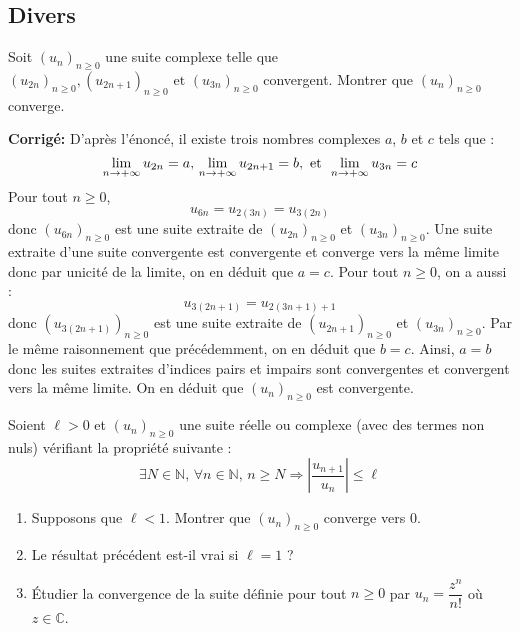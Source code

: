 \documentclass[a4paper,twoside,french,10pt]{VcCours}
\newcommand{\corr}{\textbf{Corrigé:}}
\begin{document}
\newpage

\subsection{Divers}

\medskip

\begin{Exercice}{} Soit $(u_n)_{n \geq 0}$ une suite complexe telle que $(u_{2n})_{n \geq 0},(u_{2n + 1})_{n \geq 0}{\text{ et }}(u_{3n})_{n \geq 0}$ convergent. Montrer que $(u_n)_{n \geq 0}$ converge.
\end{Exercice} 

\corr
D'après l'énoncé, il existe trois nombres complexes $a$, $b$ et $c$ tels que :
$$ \lim_{n \rightarrow + \infty} u_{2n} = a, \,  \lim_{n \rightarrow + \infty} u_{2n+1} = b,  \hbox{ et } \, \lim_{n \rightarrow + \infty} u_{3n} = c$$
Pour tout $n \geq 0$,
$$ u_{6n} = u_{2(3n)}=u_{3(2n)}$$
donc $(u_{6n})_{n \geq 0}$ est une suite extraite de $(u_{2n})_{n \geq 0}$ et $(u_{3n})_{n \geq 0}$. Une suite extraite d'une suite convergente est convergente et converge vers la même limite donc par unicité de la limite, on en déduit que $a=c$. Pour tout $n \geq 0$, on a aussi :
$$ u_{3(2n+1)}=u_{2(3n+1)+1}$$
donc $(u_{3(2n+1)})_{n \geq 0}$ est une suite extraite de $(u_{2n+1})_{n \geq 0}$ et $(u_{3n})_{n \geq 0}$. Par le même raisonnement que précédemment, on en déduit que $b=c$. Ainsi, $a=b$ donc les suites extraites d'indices pairs et impairs sont convergentes et convergent vers la même limite. On en déduit que $(u_n)_{n \geq 0}$ est convergente. 

\medskip


\begin{Exercice}{} Soient $\ell>0$ et $(u_n)_{n \geq 0}$ une suite réelle ou complexe (avec des termes non nuls) vérifiant la propriété suivante :
$$\exists N \in \mathbb{N}, \, \forall n \in \mathbb{N}, \, n \geq N \Longrightarrow \left\vert \frac{u_{n+1}}{u_n} \right\vert   \leq \ell$$

\begin{enumerate}
\item Supposons que $\ell<1$. Montrer que $(u_n)_{n \geq 0}$ converge vers $0$.
\item Le résultat précédent est-il vrai si $\ell = 1$ ?
\item Étudier la convergence de la suite définie pour tout $n \geq 0$ par $u_n = \dfrac{z^n}{n!}$ où $z \in \mathbb{C}$.
\end{enumerate}
\end{Exercice}
\end{document}
